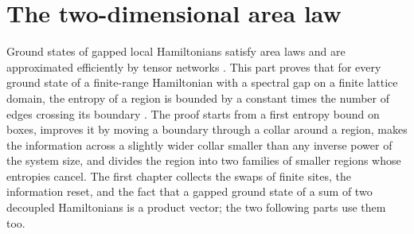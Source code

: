 \part{The two-dimensional area law}
\label{part:area_laws}

Ground states of gapped local Hamiltonians satisfy area laws and are
approximated efficiently by tensor networks \cite[Section~II.C]{Cirac2021Matrix}.
This part proves that for every ground state of a finite-range Hamiltonian with
a spectral gap on a finite lattice domain, the entropy of a region is bounded by
a constant times the number of edges crossing its boundary
\cite{OpenAI2026AreaLaw}. The proof starts from a first entropy bound on boxes,
improves it by moving a boundary through a collar around a region, makes the
information across a slightly wider collar smaller than any inverse power of
the system size, and divides the region into two families of smaller regions
whose entropies cancel. The first chapter collects the swaps of finite sites,
the information reset, and the fact that a gapped ground state of a sum of two
decoupled Hamiltonians is a product vector; the two following parts use them
too.
